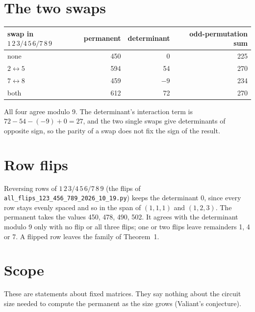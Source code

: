 \documentclass[11pt]{article}
\begin{document}
\section{The two swaps}
\begin{center}
\begin{tabular}{@{}lrrr@{}}
\toprule
swap in $1\,2\,3/4\,5\,6/7\,8\,9$ & permanent & determinant & odd-permutation sum\\
\midrule
none & 450 & 0 & 225\\
$2\leftrightarrow5$ & 594 & 54 & 270\\
$7\leftrightarrow8$ & 459 & $-9$ & 234\\
both & 612 & 72 & 270\\
\bottomrule
\end{tabular}
\end{center}
All four agree modulo 9. The determinant's interaction term is $72-54-(-9)+0=27$, and the two single swaps give
determinants of opposite sign, so the parity of a swap does not fix the sign of the result.

\section{Row flips}
Reversing rows of $1\,2\,3/4\,5\,6/7\,8\,9$ (the flips of \texttt{all\_flips\_123\_456\_789\_2026\_10\_19.py}) keeps the
determinant 0, since every row stays evenly spaced and so in the span of $(1,1,1)$ and $(1,2,3)$. The permanent takes the
values 450, 478, 490, 502. It agrees with the determinant modulo 9 only with no flip or all three flips; one or two flips
leave remainders 1, 4 or 7. A flipped row leaves the family of Theorem~1.

\section*{Scope}
These are statements about fixed matrices. They say nothing about the circuit size needed to compute the permanent as the
size grows (Valiant's conjecture).
\end{document}
